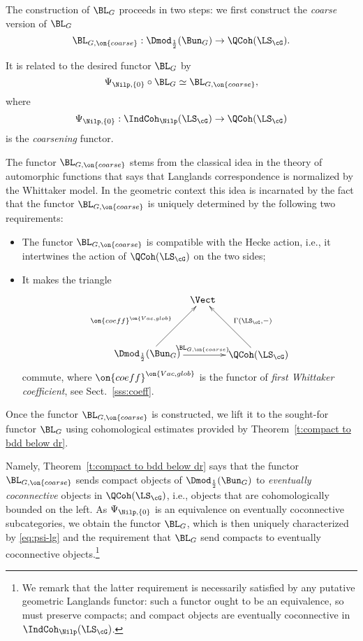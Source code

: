 \documentclass[9pt]{amsart}
\theoremstyle{remark}
\theoremstyle{definition}
\theoremstyle{remark}
\newcommand{\thmref}[1]{Theorem~\ref{#1}}
\newcommand{\secref}[1]{Sect.~\ref{#1}}
\numberwithin{equation}{section}
\begin{document}
The construction of $\BL_G$ proceeds in two steps: we first construct the \emph{coarse} version of $\BL_G$
$$\BL_{G,\on{coarse}}:\Dmod_{\frac{1}{2}}(\Bun_G)\to \QCoh(\LS_\cG).$$

It is related to the desired functor $\BL_G$ by
\begin{equation}\label{eq:psi-lg}
\Psi_{\Nilp,\{0\}}\circ \BL_G\simeq \BL_{G,\on{coarse}},
\end{equation}
where 
$$\Psi_{\Nilp,\{0\}}:\IndCoh_\Nilp(\LS_\cG)\to  \QCoh(\LS_\cG)$$
is the \emph{coarsening} functor. 

\sssec{}

The functor $\BL_{G,\on{coarse}}$ stems from the classical idea in the theory of automorphic functions
that says that Langlands correspondence is normalized by the Whittaker model. In the geometric context this 
idea is incarnated by the fact that the functor $\BL_{G,\on{coarse}}$ is uniquely determined by the following two
requirements:

\begin{itemize}

\item The functor $\BL_{G,\on{coarse}}$ is compatible with the Hecke action, i.e., it 
intertwines the action of $\QCoh(\LS_\cG)$ on the two sides;

\smallskip

\item It makes the triangle 
$$
\xy
(0,0)*+{\Dmod_{\frac{1}{2}}(\Bun_G)}="X";
(40,0)*+{\QCoh(\LS_\cG)}="Y";
(20,20)*+{\Vect}="Z";
{\ar@{->}^{\on{coeff}^{\on{Vac,glob}}} "X";"Z"};
{\ar@{->}_{\Gamma(\LS_\cG,-)} "Y";"Z"};
{\ar@{->}^{\BL_{G,\on{coarse}}} "X";"Y"}
\endxy
$$
commute, where $\on{coeff}^{\on{Vac,glob}}$ is the functor of \emph{first Whittaker coefficient}, see \secref{sss:coeff}. 

\end{itemize} 

\sssec{}

Once the functor $\BL_{G,\on{coarse}}$ is constructed, we lift it to the sought-for functor $\BL_G$ using
cohomological estimates provided by \thmref{t:compact to bdd below dr}.  

\medskip

Namely, \thmref{t:compact to bdd below dr} says that the functor $\BL_{G,\on{coarse}}$ sends compact objects of 
$\Dmod_{\frac{1}{2}}(\Bun_G)$ to \emph{eventually coconnective} objects in $\QCoh(\LS_\cG)$, i.e., objects that are
cohomologically bounded on the left.
As $\Psi_{\Nilp,\{0\}}$ is an equivalence on eventually coconnective subcategories,
we obtain the functor $\BL_G$, which is then uniquely characterized by
\eqref{eq:psi-lg} and the requirement that $\BL_G$ send compacts to eventually
coconnective objects.\footnote{We remark that the latter requirement is
necessarily satisfied by any putative geometric Langlands functor: 
such a functor ought to be an equivalence, so must preserve compacts;
and compact objects are eventually coconnective in $\IndCoh_{\Nilp}(\LS_\cG)$.}
\end{document}
